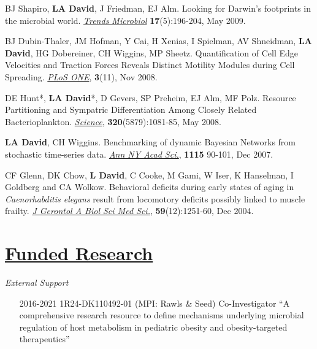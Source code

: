 \documentclass[overlapped,line,11pt]{res}
\begin{document}
\begin{resume}
\begin{revnumerate}[20]
\vspace*{1mm}
\item {BJ Shapiro, \textbf{LA David}, J Friedman, EJ Alm. Looking for
Darwin's footprints in the microbial world.  \emph{\underline{Trends Microbiol}}
\textbf{17}(5):196-204, May 2009.}

\vspace*{1mm}
\item { BJ Dubin-Thaler, JM Hofman, Y Cai, H Xenias, I Spielman, AV
  Shneidman, \textbf{LA David}, HG Dobereiner, CH Wiggins, MP Sheetz.
  Quantification of Cell Edge Velocities and Traction Forces Reveals
  Distinct Motility Modules during Cell Spreading. \emph{\underline{PLoS ONE}},
  \textbf{3}(11), Nov 2008.}

\vspace*{1mm}
\item {DE Hunt*, \textbf{LA David}*, D Gevers, SP Preheim, EJ Alm, MF
Polz.  Resource Partitioning and Sympatric Differentiation Among
Closely Related Bacterioplankton.  \emph{\underline{Science}},
\textbf{320}(5879):1081-85, May 2008.}

\vspace*{1mm}
\item {\textbf{LA David}, CH Wiggins. Benchmarking of dynamic Bayesian
  Networks from stochastic time-series data. \emph{\underline{Ann NY Acad Sci.}},
  \textbf{1115} 90-101, Dec 2007.}

\vspace*{1mm}
\item {CF Glenn, DK Chow, \textbf{L David}, C Cooke, M Gami, W Iser, K
  Hanselman, I Goldberg and CA Wolkow. Behavioral deficits during
  early states of aging in {\em Caenorhabditis elegans} result from
  locomotory deficits possibly linked to muscle frailty. \emph{\underline{J
    Gerontol A Biol Sci Med Sci.}}, \textbf{59}(12):1251-60, Dec 2004.}
\end{revnumerate}

\section{\underline{\sc Funded Research}} 
\vspace{.1in}
\emph{External Support}
\vspace{.1in}

\begin{itemize}[leftmargin=2cm, style=sameline]

\item[2016-2021] 1R24-DK110492-01 (MPI: Rawls \& Seed) \newline Co-Investigator
  \newline ``A comprehensive research resource to define mechanisms
  underlying microbial regulation of host metabolism in pediatric
  obesity and obesity-targeted therapeutics''


\end{itemize}
\end{resume}
\end{document}
